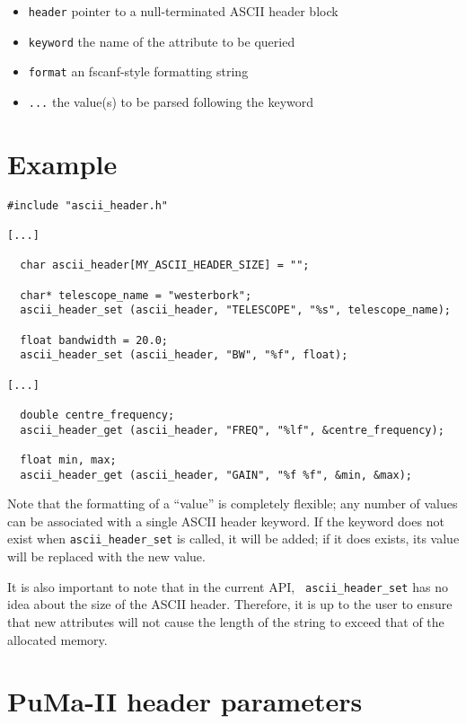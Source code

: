\begin{itemize}
\item {\tt header} pointer to a null-terminated ASCII header block

\item {\tt keyword} the name of the attribute to be queried

\item {\tt format} an fscanf-style formatting string

\item {\tt ...} the value(s) to be parsed following the keyword
\end{itemize}

\section{Example}

\begin{verbatim}
#include "ascii_header.h"

[...]

  char ascii_header[MY_ASCII_HEADER_SIZE] = "";

  char* telescope_name = "westerbork";
  ascii_header_set (ascii_header, "TELESCOPE", "%s", telescope_name);

  float bandwidth = 20.0;
  ascii_header_set (ascii_header, "BW", "%f", float);

[...]

  double centre_frequency;
  ascii_header_get (ascii_header, "FREQ", "%lf", &centre_frequency);

  float min, max;
  ascii_header_get (ascii_header, "GAIN", "%f %f", &min, &max);
\end{verbatim}

Note that the formatting of a ``value'' is completely flexible; any
number of values can be associated with a single ASCII header keyword.
If the keyword does not exist when {\tt ascii\_header\_set} is called,
it will be added; if it does exists, its value will be replaced with
the new value.

It is also important to note that in the current API, {\tt
ascii\_header\_set} has no idea about the size of the ASCII header.
Therefore, it is up to the user to ensure that new attributes will not
cause the length of the string to exceed that of the allocated memory.

\section{PuMa-II header parameters}

